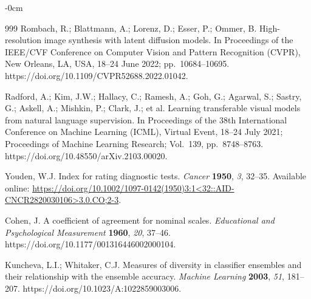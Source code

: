 \documentclass[applsci,article,submit,pdftex,moreauthors]{Definitions/mdpi}
\begin{document}
\begin{adjustwidth}{-\extralength}{0cm}
{\begin{thebibliography}{999}
Rombach, R.; Blattmann, A.; Lorenz, D.; Esser, P.; Ommer, B. High-resolution image synthesis with latent diffusion models. In Proceedings of the IEEE/CVF Conference on Computer Vision and Pattern Recognition (CVPR), New Orleans, LA, USA, 18--24 June 2022; pp.~10684--10695. https://doi.org/10.1109/CVPR52688.2022.01042.

Radford, A.; Kim, J.W.; Hallacy, C.; Ramesh, A.; Goh, G.; Agarwal, S.; Sastry, G.; Askell, A.; Mishkin, P.; Clark, J.; et al. Learning transferable visual models from natural language supervision. In Proceedings of the 38th International Conference on Machine Learning (ICML), Virtual Event, 18--24 July 2021; Proceedings of Machine Learning Research; Vol.~139, pp.~8748--8763. https://doi.org/10.48550/arXiv.2103.00020.

Youden, W.J. Index for rating diagnostic tests. {\em Cancer} {\bf 1950}, {\em 3}, 32--35. Available online: \url{https://doi.org/10.1002/1097-0142(1950)3:1<32::AID-CNCR2820030106>3.0.CO;2-3}.

Cohen, J. A coefficient of agreement for nominal scales. {\em Educational and Psychological Measurement} {\bf 1960}, {\em 20}, 37--46. https://doi.org/10.1177/001316446002000104.

Kuncheva, L.I.; Whitaker, C.J. Measures of diversity in classifier ensembles and their relationship with the ensemble accuracy. {\em Machine Learning} {\bf 2003}, {\em 51}, 181--207. https://doi.org/10.1023/A:1022859003006.
\end{thebibliography}
}

\PublishersNote{}
\end{adjustwidth}
\end{document}
